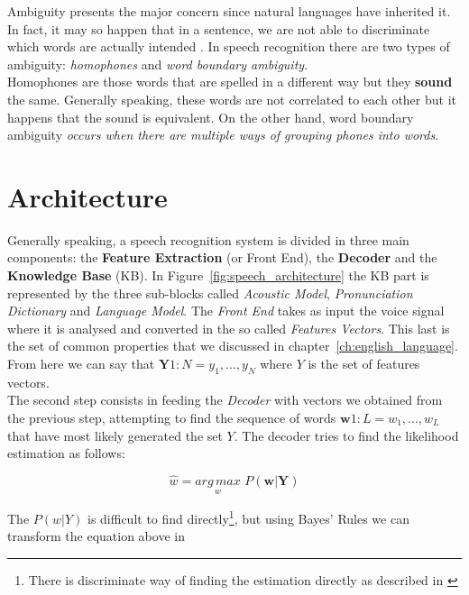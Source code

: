 \noindent Ambiguity presents the major concern since natural languages have inherited it. In fact, it may so happen that in a sentence, we are not able to discriminate which words are actually intended \cite{forsberg2003speech}. In speech recognition there are two types of ambiguity: \textit{homophones} and \textit{word boundary ambiguity}. \\
Homophones are those words that are spelled in a different way but they \textbf{sound} the same. Generally speaking, these words are not correlated to each other but it happens that the sound is equivalent. On the other hand, word boundary ambiguity \textit{occurs when there are multiple ways of grouping phones into words}\cite{forsberg2003speech}.

\section{Architecture}
\label{sec:speech_rec_Architecture}
Generally speaking, a speech recognition system is divided in three main components: the \textbf{Feature Extraction} (or Front End), the \textbf{Decoder} and the \textbf{Knowledge Base} (KB). In Figure~\ref{fig:speech_architecture} the KB part is represented by the three sub-blocks called \textit{Acoustic Model}, \textit{Pronunciation Dictionary} and \textit{Language Model}. The \textit{Front End} takes as input the voice signal where it is analysed and converted in the so called \textit{Features Vectors}. This last is the set of common properties that we discussed in chapter~\ref{ch:english_language}. From here we can say that $\textbf{Y} 1:N = y_{1},..., y_{N}$ where $Y$ is the set of features vectors. \\
The second step consists in feeding the \textit{Decoder} with vectors we obtained from the previous step, attempting to find the sequence of words $\textbf{w} 1:L = w_{1}, ... , w_{L}$ that have most likely generated the set $Y$\cite{gales2008application}. The decoder tries to find the likelihood estimation as follows:

\begin{equation}
	\widehat{w} = \underset{w}{arg \, max} \,\, P(\textbf{w}| \textbf{Y})
\end{equation}

\noindent The $P (w|Y)$ is difficult to find directly\footnote{There is discriminate way of finding the estimation directly as described in \cite{gales2007discriminative}}, but using Bayes' Rules we can transform the equation above in

